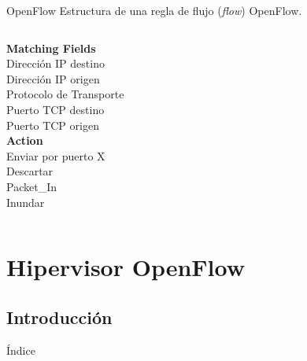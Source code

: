 \documentclass{beamer}
\begin{document}
\begin{frame}[t]{OpenFlow}
    Estructura de una regla de flujo (\textit{flow}) OpenFlow.\vspace{30pt}
    \begin{columns}[t]
    \column{1.9in} 
    \textbf{Matching Fields}\\
    Dirección IP destino \\
    Dirección IP origen\\
    Protocolo de Transporte\\
    Puerto TCP destino\\
    Puerto TCP origen\\
    \column{1.9in}
    \textbf{Action}\\
    Enviar por puerto X\\
    Descartar\\
    Packet\_In\\
    Inundar\\
    \end{columns}
    
    \vspace{40pt}
    \begin{overlayarea}{\textwidth}{2cm}
    \end{overlayarea}
\end{frame}

\section{Hipervisor OpenFlow}
\subsection{Introducción}
\begin{frame}{Índice}
    \begin{columns}[t]
        \begin{column}{1.7in}
            \tableofcontents[currentsection, subsectionstyle=show/shaded/hide, sections={1-4}]
        \end{column}
        \begin{column}{1.7in}
            \tableofcontents[currentsection, subsectionstyle=show/shaded/hide, sections={5-7}]
        \end{column}
    \end{columns}
\end{frame}
\end{document}
